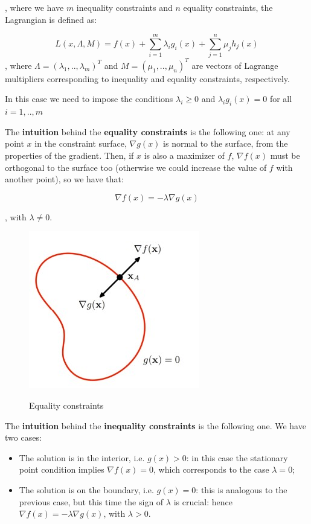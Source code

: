 , where we have $m$ inequality constraints and $n$ equality constraints, the Lagrangian is defined as:

$$
L(x, \Lambda, M) = f(x) + \sum_{i = 1}^m \lambda_i g_i(x) + \sum_{j = 1}^n \mu_j h_j(x)
$$
, where $\Lambda = (\lambda_1, .., \lambda_m)^T$ and $M = (\mu_1, .., \mu_n)^T$ are vectors of Lagrange multipliers corresponding to inequality and equality constraints, respectively.

In this case we need to impose the conditions $\lambda_i \geq 0$ and $\lambda_i g_i(x) = 0$ for all $i = 1,..,m$

The \textbf{intuition} behind the \textbf{equality constraints} is the following one: at any point $x$ in the constraint surface, $\nabla g(x)$ is normal to the surface, from the properties of the gradient. Then, if $x$ is also a maximizer of $f$, $\nabla f(x)$ must be orthogonal to the surface too (otherwise we could increase the value of $f$ with another point), so we have that:

$$
\nabla f(x) = - \lambda \nabla g(x)
$$

, with $\lambda \neq 0$.

\begin{figure}[h!]
		\centering
		\includegraphics[scale = 1.5]{img/equality constraints intuition.jpg}
		\label{svm}
		\caption{Equality constraints}
\end{figure}

The \textbf{intuition} behind the \textbf{inequality constraints} is the following one. We have two cases:

\begin{itemize}
    \item The solution is in the interior, i.e. $g(x) > 0$: in this case the stationary point condition implies $\nabla f(x) = 0$, which corresponds to the case $\lambda = 0$;
    \item The solution is on the boundary, i.e. $g(x) = 0$: this is analogous to the previous case, but this time the sign of $\lambda$ is crucial: hence $\nabla f(x) = -\lambda \nabla g(x)$, with $\lambda > 0$.
\end{itemize}

